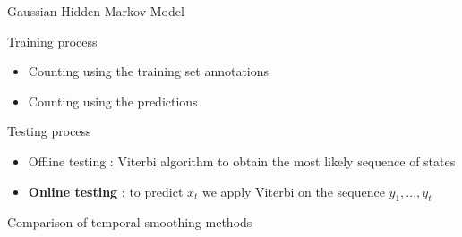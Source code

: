 \begin{frame}{Gaussian Hidden Markov Model}
	
	\begin{block}{Training process}
		\begin{itemize}
			\item Counting using the training set annotations
			\item Counting using the predictions
		\end{itemize}
	\end{block}
	
	\begin{block}{Testing process}
		\begin{itemize}
			\item Offline testing : Viterbi algorithm to obtain the most likely sequence of states
			\item \textbf{Online testing} : to predict $x_t$ we apply Viterbi on the sequence $y_1,...,y_t$
		\end{itemize}
	\end{block}

\end{frame}
	

\begin{frame}{Comparison of temporal smoothing methods}

	\begin{table}
	\begin{center}
	\end{center}
	\caption{With the predictions of our fine tuned ResNet-200}
	\end{table}

\end{frame}

